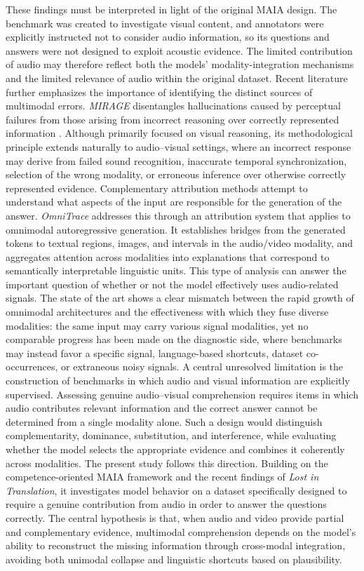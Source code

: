These findings must be interpreted in light of the original \acs{MAIA} design. The benchmark was created to investigate visual content, and annotators were explicitly instructed not to consider audio information, so its questions and answers were not designed to exploit acoustic evidence. The limited contribution of audio may therefore reflect both the models' modality-integration mechanisms and the limited relevance of audio within the original dataset.
Recent literature further emphasizes the importance of identifying the distinct sources of multimodal errors. \textit{\acs{MIRAGE}} disentangles hallucinations caused by perceptual failures from those arising from incorrect reasoning over correctly represented information \cite{dong2025mirage}. Although primarily focused on visual reasoning, its methodological principle extends naturally to audio--visual settings, where an incorrect response may derive from failed sound recognition, inaccurate temporal synchronization, selection of the wrong modality, or erroneous inference over otherwise correctly represented evidence.
Complementary attribution methods attempt to understand what aspects of the input are responsible for the generation of the answer. \textit{OmniTrace} addresses this through an attribution system that applies to omnimodal autoregressive generation. It establishes bridges from the generated tokens to textual regions, images, and intervals in the audio/video modality, and aggregates attention across modalities into explanations that correspond to semantically interpretable linguistic units. This type of analysis can answer the important question of whether or not the model effectively uses audio-related signals. The state of the art shows a clear mismatch between the rapid growth of omnimodal architectures and the effectiveness with which they fuse diverse modalities: the same input may carry various signal modalities, yet no comparable progress has been made on the diagnostic side, where benchmarks may instead favor a specific signal, language-based shortcuts, dataset co-occurrences, or extraneous noisy signals.
A central unresolved limitation is the construction of benchmarks in which audio and visual information are explicitly supervised. Assessing genuine audio--visual comprehension requires items in which audio contributes relevant information and the correct answer cannot be determined from a single modality alone. Such a design would distinguish complementarity, dominance, substitution, and interference, while evaluating whether the model selects the appropriate evidence and combines it coherently across modalities.
The present study follows this direction. Building on the competence-oriented \acs{MAIA} framework and the recent findings of \textit{Lost in Translation}, it investigates model behavior on a dataset specifically designed to require a genuine contribution from audio in order to answer the questions correctly. The central hypothesis is that, when audio and video provide partial and complementary evidence, multimodal comprehension depends on the model's ability to reconstruct the missing information through cross-modal integration, avoiding both unimodal collapse and linguistic shortcuts based on plausibility.